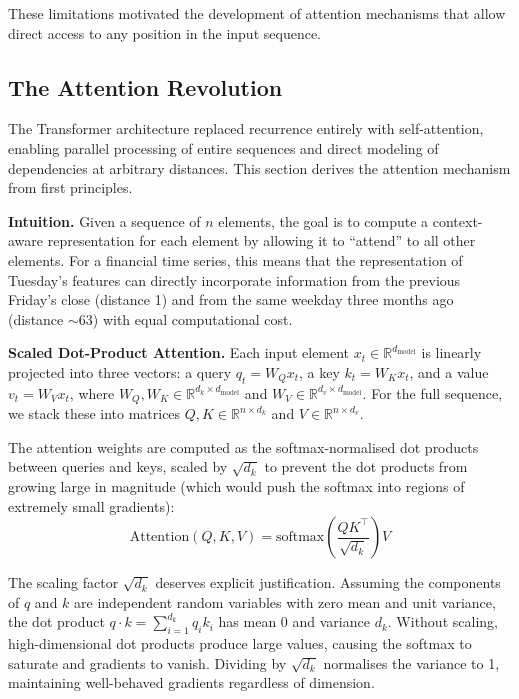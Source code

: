 \documentclass[conference]{IEEEtran}
\begin{document}
These limitations motivated the development of attention mechanisms that allow direct access to any position in the input sequence.

\subsection{The Attention Revolution}

The Transformer architecture \cite{vaswani2017attention} replaced recurrence entirely with self-attention, enabling parallel processing of entire sequences and direct modeling of dependencies at arbitrary distances. This section derives the attention mechanism from first principles.

\textbf{Intuition.} Given a sequence of $n$ elements, the goal is to compute a context-aware representation for each element by allowing it to ``attend'' to all other elements. For a financial time series, this means that the representation of Tuesday's features can directly incorporate information from the previous Friday's close (distance 1) and from the same weekday three months ago (distance $\sim$63) with equal computational cost.

\textbf{Scaled Dot-Product Attention.} Each input element $x_t \in \mathbb{R}^{d_{\text{model}}}$ is linearly projected into three vectors: a query $q_t = W_Q x_t$, a key $k_t = W_K x_t$, and a value $v_t = W_V x_t$, where $W_Q, W_K \in \mathbb{R}^{d_k \times d_{\text{model}}}$ and $W_V \in \mathbb{R}^{d_v \times d_{\text{model}}}$. For the full sequence, we stack these into matrices $Q, K \in \mathbb{R}^{n \times d_k}$ and $V \in \mathbb{R}^{n \times d_v}$.

The attention weights are computed as the softmax-normalised dot products between queries and keys, scaled by $\sqrt{d_k}$ to prevent the dot products from growing large in magnitude (which would push the softmax into regions of extremely small gradients):
\begin{equation}
\text{Attention}(Q, K, V) = \text{softmax}\!\left(\frac{QK^\top}{\sqrt{d_k}}\right) V
\label{eq:attention}
\end{equation}

The scaling factor $\sqrt{d_k}$ deserves explicit justification. Assuming the components of $q$ and $k$ are independent random variables with zero mean and unit variance, the dot product $q \cdot k = \sum_{i=1}^{d_k} q_i k_i$ has mean 0 and variance $d_k$. Without scaling, high-dimensional dot products produce large values, causing the softmax to saturate and gradients to vanish. Dividing by $\sqrt{d_k}$ normalises the variance to 1, maintaining well-behaved gradients regardless of dimension.
\end{document}
